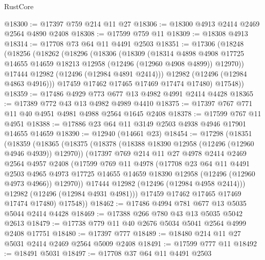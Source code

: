 \begin{lexlean}{RustCore}
\begin{coremodule}
@18300 := @17397 @759 @214 @11 @27
@18306 := @18300 @4913 @2414 @2469 @2564 @4890 @2408
@18308 := @17599 @759 @11
@18309 := @18308 @4913
@18314 := @17708 @73 @64 @11 @4491 @2503
@18351 := @17306
    (@18248
      (@18256
        (@18262
          (@18296
            (@18306
              (@18309
                (@18314
                  @4898
                  @4908
                  @17725
                  @14655
                  @14659
                  @18213
                  @12958
                  (@12496 (@12960 @4908 @4899))
                  @12970))
              @17444
              @12982
              (@12496 (@12984 @4891 @2414)))
            @12982
            (@12496 (@12984 @4863 @4916)))
          @17459
          @17462
          @17465
          @17469
          @17474
          @17480)
        @17548))
@18359 := @17486 @4929 @773 @677 @13 @4982 @4991 @2414 @4428
@18365 := @17389 @772 @43 @13 @4982 @4989 @4410
@18375 := @17397 @767 @771 @11 @40 @4951 @4981 @4988 @2564 @1645 @2408
@18378 := @17599 @767 @11 @4951
@18388 := @17886 @23 @64 @11 @3149 @2503 @4938 @4946 @17901 @14655 @14659
@18390 := @12940 (@14661 @23)
@18454 := @17298
    (@18351
      (@18359
        (@18365
          (@18375
            (@18378 (@18388 @18390 @12958 (@12496 (@12960 @4946 @4939)) @12970))
            (@17397
              @769
              @214
              @11
              @27
              @4978
              @2414
              @2469
              @2564
              @4957
              @2408
              (@17599
                @769
                @11
                @4978
                (@17708
                  @23
                  @64
                  @11
                  @4491
                  @2503
                  @4965
                  @4973
                  @17725
                  @14655
                  @14659
                  @18390
                  @12958
                  (@12496 (@12960 @4973 @4966))
                  @12970))
              @17444
              @12982
              (@12496 (@12984 @4958 @2414)))
            @12982
            (@12496 (@12984 @4931 @4981)))
          @17459
          @17462
          @17465
          @17469
          @17474
          @17480)
        @17548))
@18462 := @17486 @4994 @781 @677 @13 @5035 @5044 @2414 @4428
@18469 := @17388 @266 @780 @43 @13 @5035 @5042 @2613
@18479 := @17738 @779 @11 @40 @2676 @5034 @5041 @2564 @4999 @2408 @17751
@18480 := @17397 @777
@18489 := @18480 @214 @11 @27 @5031 @2414 @2469 @2564 @5009 @2408
@18491 := @17599 @777 @11
@18492 := @18491 @5031
@18497 := @17708 @37 @64 @11 @4491 @2503

\end{coremodule}
\end{lexlean}
